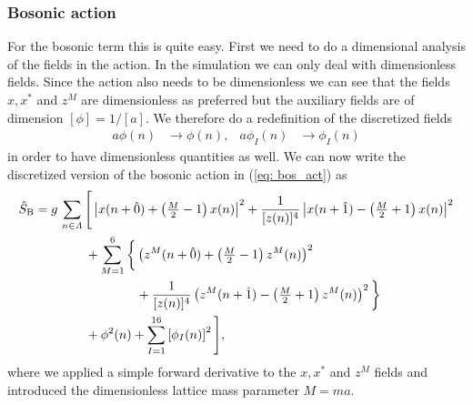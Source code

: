 \subsubsection{Bosonic action}
For the bosonic term this is quite easy. First we need to do a dimensional analysis of the fields in the action. In the simulation we can only deal with dimensionless fields. Since the action also needs to be dimensionless we can see that the fields $x,x^{*}$ and $z^{M}$ are dimensionless as preferred but the auxiliary fields are of dimension $[\phi]=1/[a]$. We therefore do a redefinition of the discretized fields
%
%
\begin{align}
a\phi(n) &\to \phi(n), & a\phi_{I}(n) &\to \phi_{I}(n)
\end{align}
%
%
in order to have dimensionless quantities as well. We can now write the discretized version of the bosonic action in (\ref{eq: bos_act}) as
%
%
\begin{align}
\hat{S}_{\rm B} &= g\, \sum\limits_{n\in\mathit{\Lambda}} \Bigg[ \left\vert x(n+\hat{0}) + \left(\tfrac{M}{2}-1\right) x(n) \right\vert^{2} 
+ \frac{1}{[z(n)]^{4}} \left\vert x(n+\hat{1}) - \left(\tfrac{M}{2}+1\right) x(n) \right\vert^{2} \notag\\
%
%
&\qquad\qquad + \sum\limits_{M=1}^{6} \bigg\lbrace \left(z^{M}(n+\hat{0}) + \left(\tfrac{M}{2} -1\right)z^{M}(n) \right)^{2} \\
%
%
&\qquad\qquad\qquad\qquad + \frac{1}{[z(n)]^{4}} \left( z^{M}(n+\hat{1}) -\left(\tfrac{M}{2}+1\right) z^{M}(n) \right)^{2} \bigg\rbrace \notag \\
&\qquad\qquad +\phi^{2}(n) + \sum\limits_{I=1}^{16}\left[\phi_{I}(n)\right]^{2} \Bigg], \notag
\end{align}
%
%
where we applied a simple forward derivative to the $x,x^{*}$ and $z^{M}$ fields and introduced the dimensionless lattice mass parameter $M=ma$.
%
%
%
%
%
%
%
%
